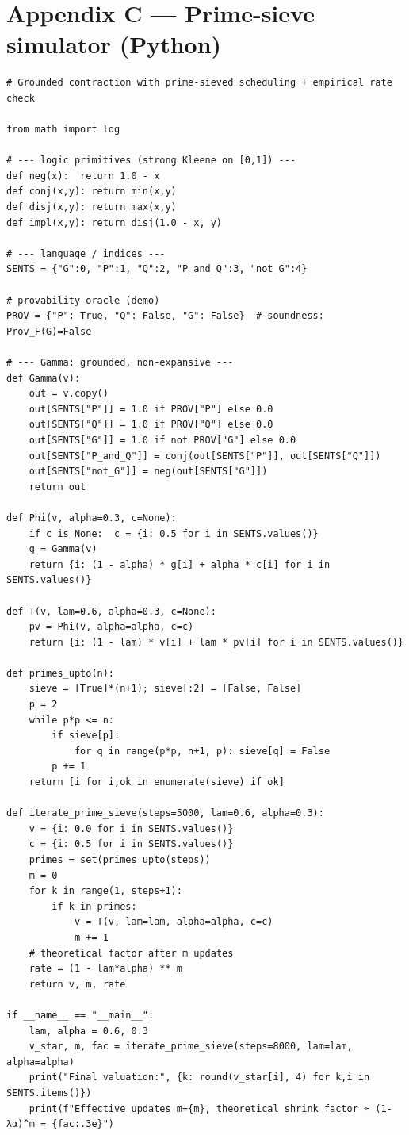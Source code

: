 \documentclass[12]{amsart}
\theoremstyle{plain}
\begin{document}
\section*{Appendix C — Prime-sieve simulator (Python)}

\begin{verbatim}
# Grounded contraction with prime-sieved scheduling + empirical rate check

from math import log

# --- logic primitives (strong Kleene on [0,1]) ---
def neg(x):  return 1.0 - x
def conj(x,y): return min(x,y)
def disj(x,y): return max(x,y)
def impl(x,y): return disj(1.0 - x, y)

# --- language / indices ---
SENTS = {"G":0, "P":1, "Q":2, "P_and_Q":3, "not_G":4}

# provability oracle (demo)
PROV = {"P": True, "Q": False, "G": False}  # soundness: Prov_F(G)=False

# --- Gamma: grounded, non-expansive ---
def Gamma(v):
    out = v.copy()
    out[SENTS["P"]] = 1.0 if PROV["P"] else 0.0
    out[SENTS["Q"]] = 1.0 if PROV["Q"] else 0.0
    out[SENTS["G"]] = 1.0 if not PROV["G"] else 0.0
    out[SENTS["P_and_Q"]] = conj(out[SENTS["P"]], out[SENTS["Q"]])
    out[SENTS["not_G"]] = neg(out[SENTS["G"]])
    return out

def Phi(v, alpha=0.3, c=None):
    if c is None:  c = {i: 0.5 for i in SENTS.values()}
    g = Gamma(v)
    return {i: (1 - alpha) * g[i] + alpha * c[i] for i in SENTS.values()}

def T(v, lam=0.6, alpha=0.3, c=None):
    pv = Phi(v, alpha=alpha, c=c)
    return {i: (1 - lam) * v[i] + lam * pv[i] for i in SENTS.values()}

def primes_upto(n):
    sieve = [True]*(n+1); sieve[:2] = [False, False]
    p = 2
    while p*p <= n:
        if sieve[p]:
            for q in range(p*p, n+1, p): sieve[q] = False
        p += 1
    return [i for i,ok in enumerate(sieve) if ok]

def iterate_prime_sieve(steps=5000, lam=0.6, alpha=0.3):
    v = {i: 0.0 for i in SENTS.values()}
    c = {i: 0.5 for i in SENTS.values()}
    primes = set(primes_upto(steps))
    m = 0
    for k in range(1, steps+1):
        if k in primes:
            v = T(v, lam=lam, alpha=alpha, c=c)
            m += 1
    # theoretical factor after m updates
    rate = (1 - lam*alpha) ** m
    return v, m, rate

if __name__ == "__main__":
    lam, alpha = 0.6, 0.3
    v_star, m, fac = iterate_prime_sieve(steps=8000, lam=lam, alpha=alpha)
    print("Final valuation:", {k: round(v_star[i], 4) for k,i in SENTS.items()})
    print(f"Effective updates m={m}, theoretical shrink factor ≈ (1-λα)^m = {fac:.3e}")
\end{verbatim}
\end{document}
